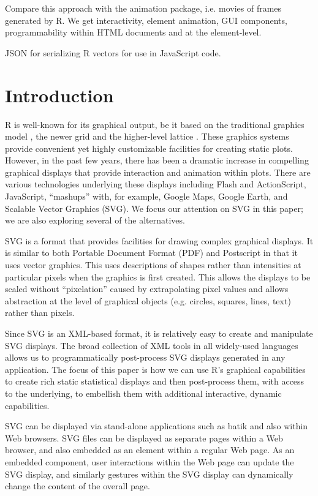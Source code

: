 \documentclass[article]{jss}
\author{Duncan Temple Lang\\
    Department of Statistics, \\
    Unversity of California at Davis}
\title{}
\begin{document}

Compare this approach with the animation package,
i.e. movies of frames generated by R.
We get interactivity, element animation, GUI components, 
programmability within HTML documents and at the element-level.

JSON for serializing R vectors for use in JavaScript code.

\section{Introduction}
R is well-known for its graphical output, be it based on the
traditional graphics model \cite{grz}, the newer grid \cite{grid} and the
higher-level lattice \cite{lattice}.  These graphics systems provide convenient yet
highly customizable facilities for creating static plots.  However, in
the past few years, there has been a dramatic increase in compelling
graphical displays that provide interaction and animation within
plots.  There are various technologies underlying these displays
including Flash and ActionScript, JavaScript, ``mashups'' with, for example,
Google Maps, Google Earth, and Scalable Vector Graphics (SVG).  
We focus our attention on SVG in this paper; we are also exploring 
several of the alternatives.

SVG is a format that provides facilities for drawing complex graphical
displays.  It is similar to both Portable Document Format (PDF) and
Postscript in that it uses vector graphics.  This uses descriptions of
shapes rather than intensities at particular pixels when the graphics
is first created.  This allows the displays to be scaled without
``pixelation'' caused by extrapolating pixel values and allows
abstraction at the level of graphical objects (e.g. circles, squares,
lines, text) rather than pixels.

Since SVG is an XML-based format, it is relatively easy to create and
manipulate SVG displays. The broad collection of XML tools in all
widely-used languages allows us to programmatically post-process SVG
displays generated in any application.  The focus of this paper is how
we can use R's graphical capabilities to create rich static
statistical displays and then post-process them, with access to the
underlying, to embellish them with additional interactive, dynamic
capabilities.

SVG can be displayed via stand-alone applications such as batik and
also within Web browsers.  SVG files can be displayed as separate
pages within a Web browser, and also embedded as an element within a
regular Web page.  As an embedded component, user interactions within
the Web page can update the SVG display, and similarly gestures within
the SVG display can dynamically change the content of the overall
page.
\end{document}
